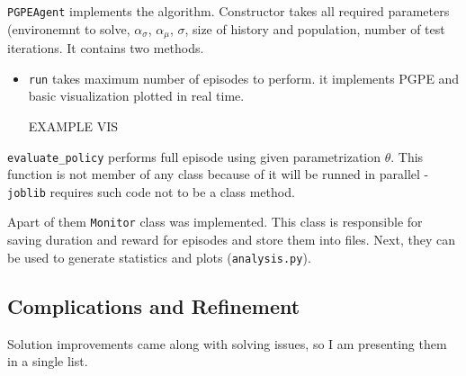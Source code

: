 \documentclass[12pt]{article}
\begin{document}
\texttt{PGPEAgent} implements the algorithm. Constructor takes all required parameters (environemnt to solve, $\alpha_\sigma$, $\alpha_\mu$, $\sigma$, size of history and population, number of test iterations. It contains two methods.

\begin{itemize}

\item \texttt{run} takes maximum number of episodes to perform. it implements PGPE and basic visualization plotted in real time.

EXAMPLE VIS

\end{itemize}

\texttt{evaluate\_policy} performs full episode using given parametrization $\theta$. This function is not member of any class because of it will be runned in parallel - \texttt{joblib} requires such code  not to be a class method.

Apart of them \texttt{Monitor} class was implemented. This class is responsible for saving duration and reward for episodes and store them into files. Next, they can be used to generate statistics and plots (\texttt{analysis.py}).

\subsection{Complications and Refinement}

Solution improvements came along with solving issues, so I am presenting them in a single list.
\end{document}
